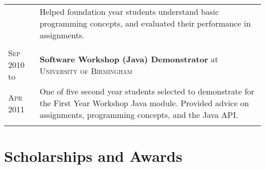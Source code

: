 \documentclass[a4paper,10pt]{article}
\newcommand{\datelen}{1.8cm}
\newcommand{\descrlen}{15.5cm}
\begin{document}
\begin{tabular}{p{\descrlen}|p{\datelen}}
\begin{comment}
  \textsc{Dec 2012}&\footnotesize{Helped foundation year students understand basic programming concepts, and evaluated their performance in assignments.}\\\multicolumn{2}{c}{}\\[-0.2cm]
  \textsc{Sep 2010} to& \textbf{Software Workshop (Java) Demonstrator} at \textsc{University of Birmingham}\\
  \textsc{Apr 2011}&\footnotesize{One of five second year students selected to demonstrate for the First Year Workshop Java module. Provided advice on assignments, programming concepts, and the Java API.}\\
  \end{comment}
\end{tabular}

\section{Scholarships and Awards}
\end{document}
